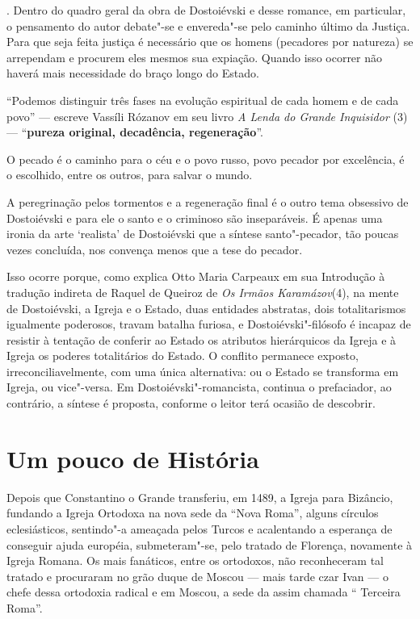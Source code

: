 . Dentro do quadro geral da obra de Dostoiévski e desse romance, em
particular, o pensamento do autor debate"-se e envereda"-se pelo caminho
último da Justiça. Para que seja feita justiça é necessário que os
homens (pecadores por natureza) se arrependam e procurem eles mesmos sua
expiação. Quando isso ocorrer não haverá mais necessidade do braço longo
do Estado.

``Podemos distinguir três fases na evolução espiritual de cada homem e
de cada povo'' --- escreve Vassíli Rózanov em seu livro \emph{A Lenda do
Grande Inquisidor} (3) --- ``\textbf{pureza original, decadência,
regeneração}''.

O pecado é o caminho para o céu e o povo russo, povo pecador por
excelência, é o escolhido, entre os outros, para salvar o mundo.

A peregrinação pelos tormentos e a regeneração final é o outro tema
obsessivo de Dostoiévski e para ele o santo e o criminoso são
inseparáveis. É apenas uma ironia da arte `realista' de Dostoiévski que
a síntese santo"-pecador, tão poucas vezes concluída, nos convença menos
que a tese do pecador.

Isso ocorre porque, como explica Otto Maria Carpeaux em sua Introdução à
tradução indireta de Raquel de Queiroz de \emph{Os Irmãos Karamázov}(4),
na mente de Dostoiévski, a Igreja e o Estado, duas entidades abstratas,
dois totalitarismos igualmente poderosos, travam batalha furiosa, e
Dostoiévski"-filósofo é incapaz de resistir à tentação de conferir ao
Estado os atributos hierárquicos da Igreja e à Igreja os poderes
totalitários do Estado. O conflito permanece exposto,
irreconciliavelmente, com uma única alternativa: ou o Estado se
transforma em Igreja, ou vice"-versa. Em Dostoiévski"-romancista,
continua o prefaciador, ao contrário, a síntese é proposta, conforme
o leitor terá ocasião de descobrir.

\section{Um pouco de História}

Depois que Constantino o Grande transferiu, em 1489, a Igreja para
Bizâncio, fundando a Igreja Ortodoxa na nova sede da ``Nova Roma'',
alguns círculos eclesiásticos, sentindo"-a ameaçada pelos Turcos e
acalentando a esperança de conseguir ajuda européia, submeteram"-se, pelo
tratado de Florença, novamente à Igreja Romana. Os mais fanáticos, entre
os ortodoxos, não reconheceram tal tratado e procuraram no grão duque de
Moscou --- mais tarde czar Ivan  --- o chefe dessa ortodoxia radical e
em Moscou, a sede da assim chamada `` Terceira Roma''.

